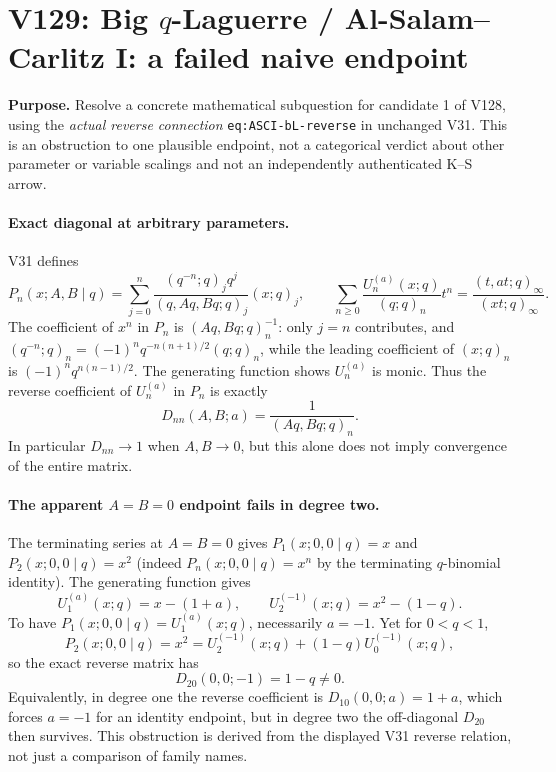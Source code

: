 \documentclass[11pt]{article}
\begin{document}
\clearpage
\section{V129: Big $q$-Laguerre / Al-Salam--Carlitz I: a failed naive endpoint}
\noindent\textbf{Purpose.} Resolve a concrete mathematical subquestion for candidate 1 of V128, using the \emph{actual reverse connection} \texttt{eq:ASCI-bL-reverse} in unchanged V31. This is an obstruction to one plausible endpoint, not a categorical verdict about other parameter or variable scalings and not an independently authenticated K--S arrow.

\paragraph{Exact diagonal at arbitrary parameters.}
V31 defines
\[
 P_n(x;A,B\mid q)=\sum_{j=0}^n
 \frac{(q^{-n};q)_j q^j}{(q,Aq,Bq;q)_j}(x;q)_j,
 \qquad
 \sum_{n\ge0}\frac{U_n^{(a)}(x;q)}{(q;q)_n}t^n
 =\frac{(t,at;q)_\infty}{(xt;q)_\infty}.
\]
The coefficient of $x^n$ in $P_n$ is $(Aq,Bq;q)_n^{-1}$: only $j=n$ contributes, and
\((q^{-n};q)_n=(-1)^n q^{-n(n+1)/2}(q;q)_n\), while the leading coefficient of $(x;q)_n$ is $(-1)^nq^{n(n-1)/2}$. The generating function shows $U_n^{(a)}$ is monic. Thus the reverse coefficient of $U_n^{(a)}$ in $P_n$ is exactly
\begin{equation}\label{eq:v129-diagonal}
 \boxed{D_{nn}(A,B;a)=\frac{1}{(Aq,Bq;q)_n}.}
\end{equation}
In particular $D_{nn}\to1$ when $A,B\to0$, but this alone does not imply convergence of the entire matrix.

\paragraph{The apparent $A=B=0$ endpoint fails in degree two.}
The terminating series at $A=B=0$ gives $P_1(x;0,0\mid q)=x$ and $P_2(x;0,0\mid q)=x^2$ (indeed $P_n(x;0,0\mid q)=x^n$ by the terminating $q$-binomial identity). The generating function gives
\[
 U_1^{(a)}(x;q)=x-(1+a),\qquad
 U_2^{(-1)}(x;q)=x^2-(1-q).
\]
To have $P_1(x;0,0\mid q)=U_1^{(a)}(x;q)$, necessarily $a=-1$. Yet for $0<q<1$,
\[
 P_2(x;0,0\mid q)=x^2
 =U_2^{(-1)}(x;q)+(1-q)U_0^{(-1)}(x;q),
\]
so the exact reverse matrix has
\begin{equation}\label{eq:v129-obstruction}
 \boxed{D_{20}(0,0;-1)=1-q\ne0.}
\end{equation}
Equivalently, in degree one the reverse coefficient is $D_{10}(0,0;a)=1+a$, which forces $a=-1$ for an identity endpoint, but in degree two the off-diagonal $D_{20}$ then survives. This obstruction is derived from the displayed V31 reverse relation, not just a comparison of family names.
\end{document}
